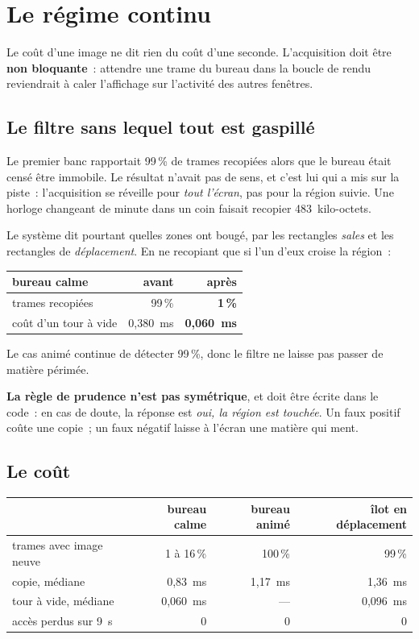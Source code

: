\documentclass[11pt,a4paper]{article}
\newcommand{\np}[1]{#1}
\begin{document}
\section{Le régime continu}

Le coût d'une image ne dit rien du coût d'une seconde. L'acquisition doit être
\textbf{non bloquante}~: attendre une trame du bureau dans la boucle de rendu
reviendrait à caler l'affichage sur l'activité des autres fenêtres.

\subsection{Le filtre sans lequel tout est gaspillé}

Le premier banc rapportait 99\,\% de trames recopiées alors que le bureau était
censé être immobile. Le résultat n'avait pas de sens, et c'est lui qui a mis
sur la piste~: l'acquisition se réveille pour \emph{tout l'écran}, pas pour la
région suivie. Une horloge changeant de minute dans un coin faisait recopier
483~kilo-octets.

Le système dit pourtant quelles zones ont bougé, par les rectangles
\emph{sales} et les rectangles de \emph{déplacement}. En ne recopiant que si
l'un d'eux croise la région~:

\begin{center}
\begin{tabular}{lrr}
\toprule
bureau calme & avant & après \\
\midrule
trames recopiées & 99\,\% & \textbf{1\,\%} \\
coût d'un tour à vide & \np{0,380}~ms & \textbf{\np{0,060}~ms} \\
\bottomrule
\end{tabular}
\end{center}

Le cas animé continue de détecter 99\,\%, donc le filtre ne laisse pas passer
de matière périmée.

\textbf{La règle de prudence n'est pas symétrique}, et doit être écrite dans le
code~: en cas de doute, la réponse est \emph{oui, la région est touchée}. Un
faux positif coûte une copie~; un faux négatif laisse à l'écran une matière qui
ment.

\subsection{Le coût}

\begin{center}
\begin{tabular}{lrrr}
\toprule
& bureau calme & bureau animé & îlot en déplacement \\
\midrule
trames avec image neuve & 1 à 16\,\% & 100\,\% & 99\,\% \\
copie, médiane & \np{0,83}~ms & \np{1,17}~ms & \np{1,36}~ms \\
tour à vide, médiane & \np{0,060}~ms & --- & \np{0,096}~ms \\
accès perdus sur 9~s & 0 & 0 & 0 \\
\bottomrule
\end{tabular}
\end{center}
\end{document}
